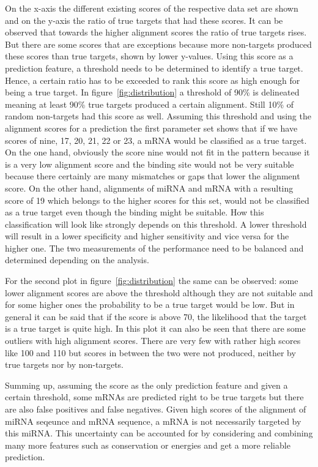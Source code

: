 \documentclass[12pt]{article}
\begin{document}
On the x-axis the different existing scores of the respective data set are shown and on the y-axis the ratio of true targets that had these scores. It can be observed that towards the higher alignment scores the ratio of true targets rises. But there are some scores that are exceptions because more non-targets produced these scores than true targets, shown by lower y-values. Using this score as a prediction feature, a threshold needs to be determined to identify a true target. Hence, a certain ratio has to be exceeded to rank this score as high enough for being a true target. In figure~\ref{fig:distribution} a threshold of 90\% is delineated meaning at least 90\% true targets produced a certain alignment. Still 10\% of random non-targets had this score as well. Assuming this threshold and using the alignment scores for a prediction the first parameter set shows that if we have scores of nine, 17, 20, 21, 22 or 23, a mRNA would be classified as a true target. On the one hand, obviously the score nine would not fit in the pattern because it is a very low alignment score and the binding site would not be very suitable because there certainly are many mismatches or gaps that lower the alignment score. On the other hand, alignments of miRNA and mRNA with a resulting score of 19 which belongs to the higher scores for this set, would not be classified as a true target even though the binding might be suitable. How this classification will look like strongly depends on this threshold. A lower threshold will result in a lower specificity and higher sensitivity and vice versa for the higher one. The two measurements of the performance need to be balanced and determined depending on the analysis.

For the second plot in figure~\ref{fig:distribution} the same can be observed: some lower alignment scores are above the threshold although they are not suitable and for some higher ones the probability to be a true target would be low. But in general it can be said that if the score is above 70, the likelihood that the target is a true target is quite high. In this plot it can also be seen that there are some outliers with high alignment scores. There are very few with rather high scores like 100 and 110 but scores in between the two were not produced, neither by true targets nor by non-targets.  

Summing up, assuming the score as the only prediction feature and given a certain threshold, some mRNAs are predicted right to be true targets but there are also false positives and false negatives. Given high scores of the alignment of miRNA seqeunce and mRNA sequence, a mRNA is not necessarily targeted by this miRNA. This uncertainty can be accounted for by considering and combining many more features such as conservation or energies and get a more reliable prediction.\\\\ 
\end{document}
